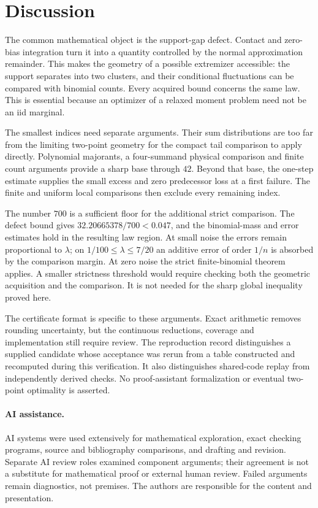 \section{Discussion}\label{ms:discussion}
The common mathematical object is the support-gap defect. Contact and
zero-bias integration turn it into a quantity controlled by the normal
approximation remainder. This makes the geometry of a possible
extremizer accessible: the support separates into two clusters, and
their conditional fluctuations can be compared with binomial counts.
Every acquired bound concerns the same law. This is essential because
an optimizer of a relaxed moment problem need not be an iid marginal.

The smallest indices need separate arguments. Their sum distributions
are too far from the limiting two-point geometry for the compact tail
comparison to apply directly. Polynomial majorants, a four-summand
physical comparison and finite count arguments provide a sharp base
through $42$. Beyond that base, the one-step estimate supplies the
small excess and zero predecessor loss at a first failure. The finite
and uniform local comparisons then exclude every remaining index.

The number $700$ is a sufficient floor for the additional strict
comparison. The defect bound gives $32.20665378/700<0.047$, and the
binomial-mass and error estimates hold in the resulting law region.
At small noise the errors remain proportional to $\lambda$; on
$1/100\le\lambda\le7/20$ an additive error of order $1/n$ is
absorbed by the comparison margin. At zero noise the strict
finite-binomial theorem applies. A smaller strictness threshold would
require checking both the geometric acquisition and the comparison.
It is not needed for the sharp global inequality proved here.

The certificate format is specific to these arguments. Exact
arithmetic removes rounding uncertainty, but the continuous reductions,
coverage and implementation still require review. The reproduction
record distinguishes a supplied candidate whose acceptance was rerun
from a table constructed and recomputed during this verification.
It also distinguishes shared-code replay from independently derived
checks. No proof-assistant formalization or eventual two-point
optimality is asserted.

\paragraph{AI assistance.}
AI systems were used extensively for mathematical exploration, exact
checking programs, source and bibliography comparisons, and drafting
and revision. Separate AI review roles examined component arguments;
their agreement is not a substitute for mathematical proof or external
human review. Failed arguments remain diagnostics, not premises. The
authors are responsible for the content and presentation.

